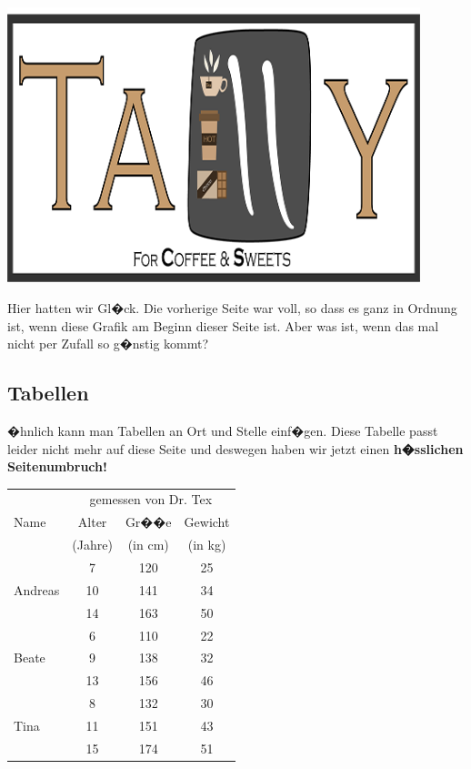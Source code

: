 \documentclass[11pt,a4paper]{article} %
\begin{document}
\begin{center}
\includegraphics[width=12cm]{TallyLogo.png}
\end{center}

Hier hatten wir Gl�ck. Die vorherige Seite war voll, so dass es ganz in Ordnung ist, wenn diese Grafik am Beginn dieser Seite ist. Aber was ist, wenn das mal nicht per Zufall so g�nstig kommt?

\subsection{Tabellen}
\label{Tabellen}

�hnlich kann man Tabellen an Ort und Stelle einf�gen. Diese Tabelle passt leider nicht mehr auf diese Seite und deswegen haben wir jetzt einen \textbf{h�sslichen Seitenumbruch!}

\begin{center}
\begin{tabular}{|l||c|c|c|}
\hline
           & \multicolumn{3}{|c|}{gemessen von Dr. Tex} \\
\cline{2-4}
Name       &  Alter    & Gr��e   & Gewicht \\
           &  (Jahre)  & (in cm) & (in kg) \\
\hline
\hline
           &   7       &  120    &  25     \\
\cline{2-4}
Andreas    &   10      &  141    &  34     \\
\cline{2-4}
           &   14      &  163    &  50     \\
\hline
           &   6       &  110    &  22     \\
\cline{2-4}
Beate      &   9       &  138    &  32     \\
\cline{2-4}
           &   13      &  156    &  46     \\
\hline
           &   8       &  132    &  30     \\
\cline{2-4}
Tina       &   11      &  151    &  43     \\
\cline{2-4}
           &   15      &  174    &  51     \\
\hline
\end{tabular}
\end{center}
\end{document}

